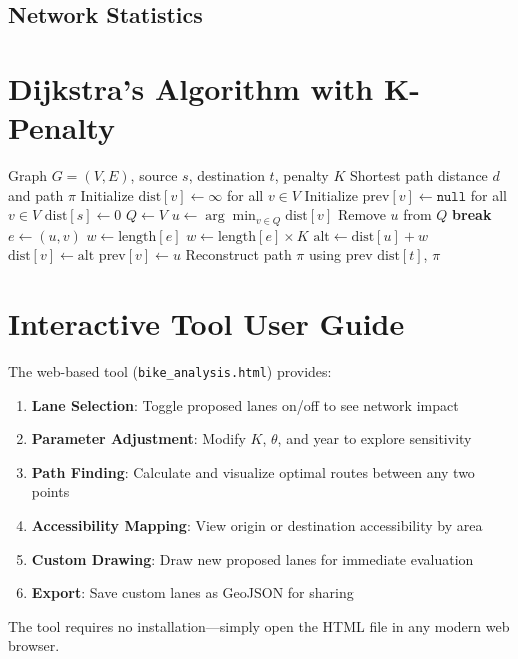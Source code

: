 \documentclass[12pt,a4paper]{article}
\begin{document}


\subsection{Network Statistics}



\section{Dijkstra's Algorithm with K-Penalty}
\label{app:algorithm}

\begin{algorithm}[H]
\caption{Dijkstra's Algorithm with K-Penalty}
\begin{algorithmic}[1]
\Require Graph $G = (V, E)$, source $s$, destination $t$, penalty $K$
\Ensure Shortest path distance $d$ and path $\pi$
\State Initialize $\text{dist}[v] \gets \infty$ for all $v \in V$
\State Initialize $\text{prev}[v] \gets \texttt{null}$ for all $v \in V$
\State $\text{dist}[s] \gets 0$
\State $Q \gets V$ 
    \State $u \gets \arg\min_{v \in Q} \text{dist}[v]$
    \State Remove $u$ from $Q$
        \State \textbf{break}
    \EndIf
        \State $e \gets (u, v)$
            \State $w \gets \text{length}[e]$
        \Else
            \State $w \gets \text{length}[e] \times K$
        \EndIf
        \State $\text{alt} \gets \text{dist}[u] + w$
            \State $\text{dist}[v] \gets \text{alt}$
            \State $\text{prev}[v] \gets u$
        \EndIf
    \EndFor
\EndWhile
\State Reconstruct path $\pi$ using $\text{prev}$
\State \Return $\text{dist}[t]$, $\pi$
\end{algorithmic}
\end{algorithm}

\section{Interactive Tool User Guide}
\label{app:user_guide}

The web-based tool (\texttt{bike\_analysis.html}) provides:

\begin{enumerate}
    \item \textbf{Lane Selection}: Toggle proposed lanes on/off to see network impact
    \item \textbf{Parameter Adjustment}: Modify $K$, $\theta$, and year to explore sensitivity
    \item \textbf{Path Finding}: Calculate and visualize optimal routes between any two points
    \item \textbf{Accessibility Mapping}: View origin or destination accessibility by area
    \item \textbf{Custom Drawing}: Draw new proposed lanes for immediate evaluation
    \item \textbf{Export}: Save custom lanes as GeoJSON for sharing
\end{enumerate}

The tool requires no installation---simply open the HTML file in any modern web browser.
\end{document}
